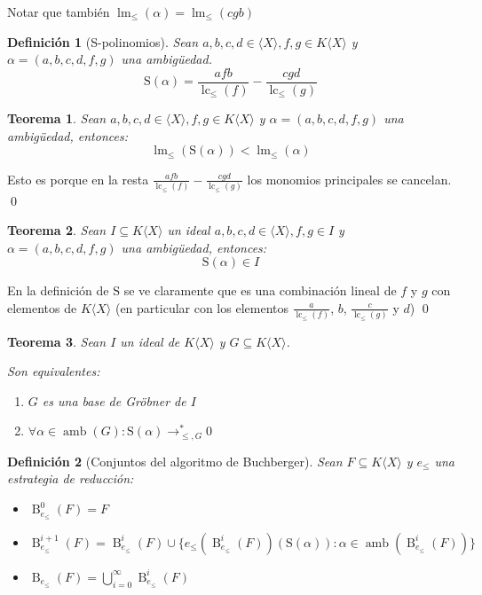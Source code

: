\documentclass{amsbook} %
\theoremstyle{customstyle}
\newtheorem{definition}{Definición}[chapter]
\newtheorem{theorem}{Teorema}[chapter]
\renewenvironment{proof}[1][\proofname]{{\bfseries #1: }}{\qed} %
\theoremstyle{factstyle}
\DeclareMathOperator{\lm}{lm}
\DeclareMathOperator{\lc}{lc}
\DeclareMathOperator{\amb}{amb}
\renewcommand{\S}{\text{S}}
\DeclareMathOperator{\B}{B}
\begin{document}
Notar que también $\lm_≤{(α)} = \lm_≤{(cgb)}$

\begin{definition}[S-polinomios]
Sean $a, b, c, d ∈ ⟨X⟩, f, g ∈ K⟨X⟩$ y $α = (a, b, c, d, f, g)$ una ambigüedad.
\[ \S(α) = \frac{afb}{\lc_≤{(f)}} - \frac{cgd}{\lc_≤{(g)}} \]
\end{definition}

\begin{theorem}
Sean $a, b, c, d ∈ ⟨X⟩, f, g ∈ K⟨X⟩$ y $α = (a, b, c, d, f, g)$ una ambigüedad, entonces:
\[ \lm_≤{(\S(α))} < \lm_≤{(α)} \]
\end{theorem}
\begin{proof}
Esto es porque en la resta $\frac{afb}{\lc_≤{(f)}} - \frac{cgd}{\lc_≤{(g)}}$ los monomios principales se cancelan.
\end{proof}

\begin{theorem}\label{thm:S es cerrado en ideal}
Sean $I ⊆ K⟨X⟩$ un ideal $a, b, c, d ∈ ⟨X⟩, f, g ∈ I$ y $α = (a, b, c, d, f, g)$ una ambigüedad, entonces:
\[ \S(α) ∈ I \]
\end{theorem}
\begin{proof}
En la definición de $\S$ se ve claramente que es una combinación lineal de $f$ y $g$ con elementos de $K⟨X⟩$ (en particular con los elementos $\frac{a}{\lc_≤{(f)}}$, $b$, $\frac{c}{\lc_≤{(g)}}$ y $d$)
\end{proof}

\begin{theorem}\label{thm:equivalencias de base de Gröbner (con ambs)}
Sean $I$ un ideal de $K⟨X⟩$ y $G ⊆ K⟨X⟩$.

Son equivalentes:
\begin{enumerate}
\item $G$ es una base de Gröbner de $I$

\item $∀α ∈ \amb(G) : \S(α) →^*_{≤, G} 0$

\end{enumerate}
\end{theorem}


\begin{definition}[Conjuntos del algoritmo de Buchberger]
Sean $F ⊆ K⟨X⟩$ y $e_≤$ una estrategia de reducción:
\begin{itemize}
\item $\B_{e_≤}^0(F) = F$
\item $\B_{e_≤}^{i + 1}(F) = \B_{e_≤}^i(F) ∪ \{e_≤(\B_{e_≤}^i(F))(\S(α)) : α ∈ \amb(\B_{e_≤}^i(F))\}$
\item $\B_{e_≤}(F) = ⋃_{i = 0}^∞ \B_{e_≤}^i(F)$
\end{itemize}
\end{definition}
\end{document}
